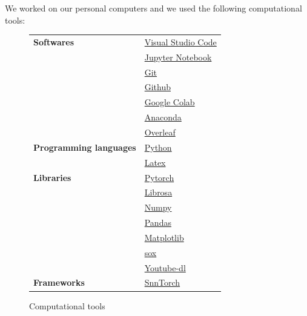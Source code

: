 \documentclass[11pt]{article}
\begin{document}
We worked on our personal computers and we used the following computational tools:


\begin{figure}[h]
  \begin{center}
    \begin{tabularx}{\textwidth}{|X|X|}
      \hline
      \textbf{Softwares}  & \href{https://code.visualstudio.com/}{Visual Studio Code}     \\
                          & \href{https://jupyter.org/}{Jupyter Notebook}                 \\
                          & \href{https://git-scm.com/}{Git}                              \\
                          & \href{https://github.com/}{Github}                            \\
                          & \href{https://colab.research.google.com/}{Google Colab}       \\
                          & \href{https://www.anaconda.com/products/individual}{Anaconda} \\
                          & \href{https://www.overleaf.com/}{Overleaf}                    \\
      \hline
      \textbf{Programming languages}
                          & \href{https://www.python.org/}{Python}                        \\
                          & \href{https://www.latex-project.org/}{Latex}                  \\
      \hline
      \textbf{Libraries}  & \href{https://pytorch.org/}{Pytorch}                          \\
                          & \href{https://librosa.org/doc/latest/index.html}{Librosa}     \\
                          & \href{https://numpy.org/}{Numpy}                              \\
                          & \href{https://pandas.pydata.org/}{Pandas}                     \\
                          & \href{https://matplotlib.org/}{Matplotlib}                    \\
                          & \href{https://pysox.readthedocs.io/en/latest/}{sox}           \\
                          & \href{https://github.com/ytdl-org/youtube-dl}{Youtube-dl}     \\
      \hline
      \textbf{Frameworks} & \href{https://github.com/eriksoper/SnnTorch}{SnnTorch}        \\
      \hline
    \end{tabularx}
  \end{center}
  \caption{Computational tools}
\end{figure}
\end{document}
